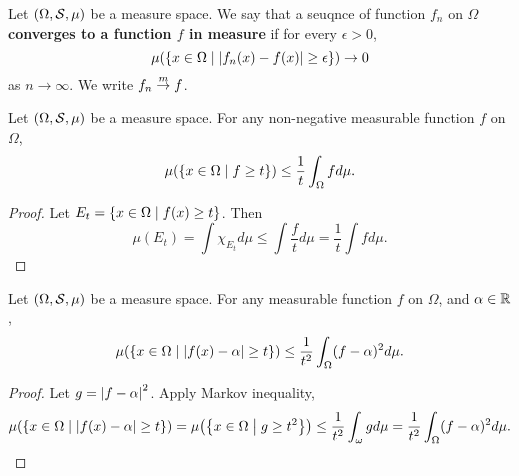\begin{definition}
    Let $(\Omega, \S, \mu)$ be a measure space. We say that a seuqnce 
    of function $f_n$ on $\Omega$ \textbf{converges to a function $f$ in measure} 
    if for every $\epsilon>0$, 
    \begin{equation*}
        \mu\pth{\Set{x\in\Omega}{|f_n(x)-f(x)|\geq \epsilon}} \to 0
    \end{equation*}
    as $n\to\infty$. We write $f_n\mto f$.
\end{definition}

\begin{theorem}
    Let $(\Omega, \S, \mu)$ be a measure space. For any 
    non-negative measurable function $f$ on $\Omega$, 
    \begin{equation*}
        \mu\pth{\Set{x\in\Omega}{f\geq t}} \leq \frac{1}{t}\int_\Omega fd\mu.
    \end{equation*}
\end{theorem}
\begin{proof}
    Let $E_t = \Set{x\in\Omega}{f(x)\geq t}$. Then 
    \begin{equation*}
        \mu(E_t) = \int \chi_{E_t}d\mu \leq \int \frac{f}{t}d\mu = \frac{1}{t}\int fd\mu.
    \end{equation*}
\end{proof}

\begin{corollary}
    Let $(\Omega, \S, \mu)$ be a measure space. For any measurable function $f$ on $\Omega$, 
    and $\alpha\in\R$, 
    \begin{equation*}
        \mu\pth{\Set{x\in\Omega}{\abs{f(x)-\alpha}\geq t}} \leq \frac{1}{t^2}\int_\Omega (f-\alpha)^2d\mu.
    \end{equation*}
\end{corollary}
\begin{proof}
    Let $g = \abs{f-\alpha}^2$. Apply Markov inequality, 
    \begin{equation*}
        \mu\pth{\Set{x\in\Omega}{\abs{f(x)-\alpha}\geq t}} = \mu\pth{\Set{x\in\Omega}{g\geq t^2}} 
        \leq \frac{1}{t^2}\int_\omega gd\mu = \frac{1}{t^2}\int_\Omega (f-\alpha)^2d\mu.
    \end{equation*}
\end{proof}

